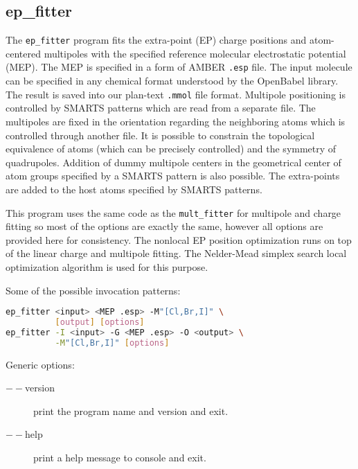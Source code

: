 \documentclass[10pt,a4paper]{article}
\begin{document}
\subsection{ep\_fitter}

The \lstinline{ep_fitter} program fits the extra-point (EP) charge positions and 
atom-centered multipoles with the specified
reference molecular electrostatic potential (MEP). The MEP is specified in a form of AMBER 
\lstinline{.esp} file. The input molecule can be specified in any chemical format
understood by the OpenBabel library. The result is saved
into our plan-text \lstinline{.mmol} file format. Multipole positioning is controlled by 
SMARTS patterns which are read from a separate file. The multipoles are fixed in the 
orientation regarding the neighboring atoms which is controlled through another file. 
It is possible to constrain the topological
equivalence of atoms (which can be precisely controlled) and the symmetry of quadrupoles. 
Addition of dummy multipole centers in the geometrical center of atom groups specified 
by a SMARTS pattern is also possible. The extra-points are added to the host atoms 
specified by SMARTS patterns.

This program uses the same code as the \lstinline{mult_fitter} for multipole and charge
fitting so most of the options are exactly the same, however all options are provided here 
for consistency. The nonlocal EP position optimization runs on top of the linear charge and
multipole fitting. The Nelder-Mead simplex search local optimization algorithm is used for
this purpose.

Some of the possible invocation patterns:
\begin{lstlisting}[language=bash]
ep_fitter <input> <MEP .esp> -M"[Cl,Br,I]" \
          [output] [options]
ep_fitter -I <input> -G <MEP .esp> -O <output> \
          -M"[Cl,Br,I]" [options]
\end{lstlisting}

Generic options:
\begin{description}
\item[$--$version] print the program name and version and exit.
\item[$--$help] print a help message to console and exit.
\end{description}
\end{document}
